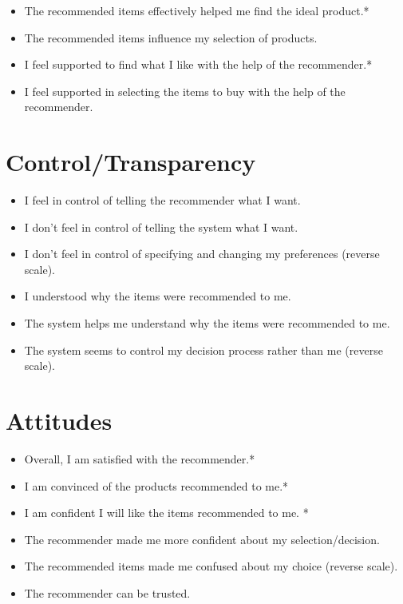 \begin{itemize}
\item The recommended items effectively helped me find the ideal product.*
\item The recommended items influence my selection of products.
\item I feel supported to find what I like with the help of the recommender.*
\item I feel supported in selecting the items to buy with the help of the recommender.
\end{itemize}

\section{Control/Transparency}

\begin{itemize}
\item I feel in control of telling the recommender what I want.
\item I don’t feel in control of telling the system what I want.
\item I don’t feel in control of specifying and changing my preferences (reverse scale).
\item I understood why the items were recommended to me.
\item The system helps me understand why the items were recommended to me.
\item The system seems to control my decision process rather than me (reverse scale).
\end{itemize}

\section{Attitudes}

\begin{itemize}
\item Overall, I am satisfied with the recommender.*
\item I am convinced of the products recommended to me.*
\item I am confident I will like the items recommended to me. *
\item The recommender made me more confident about my selection/decision.
\item The recommended items made me confused about my choice (reverse scale).
\item The recommender can be trusted.
\end{itemize}

